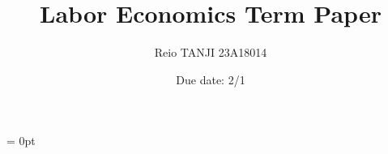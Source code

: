 \documentclass[dvipdfmx, 12pt]{article}
\begin{document}
\parindent = 0pt

\title{Labor Economics Term Paper}
\author{Reio TANJI 23A18014}
\date{Due date: 2/1}
\maketitle
\end{document}
